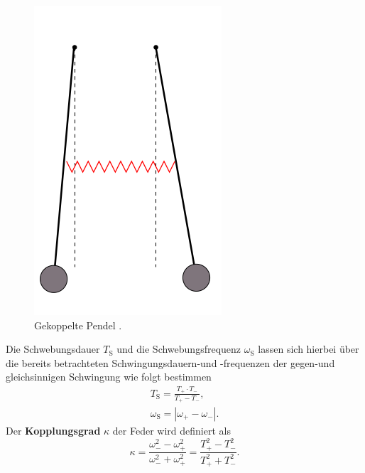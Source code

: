 \begin{figure}
	\centering
	\includegraphics[width=0.4\linewidth]{Bilder/gekoppelt.png}
	\caption{Gekoppelte Pendel \cite{Anleitung}.}
	\label{fig:schwebe}

\end{figure}
\FloatBarrier
Die Schwebungsdauer $T_{\mathrm{S}}$ und die Schwebungsfrequenz $\omega_{\mathrm{S}}$ lassen sich hierbei über die bereits betrachteten Schwingungsdauern-und -frequenzen der gegen-und gleichsinnigen Schwingung wie folgt bestimmen
\begin{gather}
	\label{eqn:twschwebe}
	T_{\mathrm{S}}=\frac{T_{\mathrm{+}}\cdot T_{\mathrm{-}}}{T_{\mathrm{+}}-T_{\mathrm{-}}} \text{,}\\
	\label{eqn:twtest}
	\omega_{\mathrm{S}}=|\omega_{\mathrm{+}}-\omega_{\mathrm{-}}| \text{.}
\end{gather}
Der \textbf{Kopplungsgrad} $\kappa$ der Feder wird definiert als
\begin{equation}
	\label{eqn:kappa}
	\kappa=\frac{\omega_{\mathrm{-}}^2-\omega_{\mathrm{+}}^2}{\omega_{\mathrm{-}}^2+\omega_{\mathrm{+}}^2}=\frac{T_{\mathrm{+}}^2-T_{\mathrm{-}}^2}{T_{\mathrm{+}}^2+T_{\mathrm{-}}^2} \text{.}
\end{equation}
